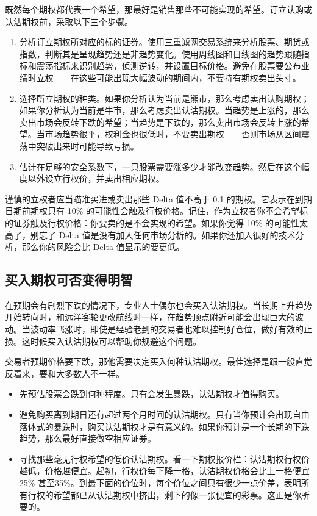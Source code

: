 既然每个期权都代表一个希望，那最好是销售那些不可能实现的希望。订立认购或认沽期权前，采取以下三个步骤。
\begin{enumerate}
    \item 分析订立期权所对应的标的证券。使用三重滤网交易系统来分析股票、期货或指数，判断其是呈现趋势还是非趋势变化。使用周线图和日线图的趋势跟随指标和震荡指标来识别趋势，侦测逆转，并设置目标价格。避免在股票要公布业绩时立权——在这些可能出现大幅波动的期间内，不要持有期权卖出头寸。
    \item 选择所立期权的种类。如果你分析认为当前是熊市，那么考虑卖出认购期权；如果你分析认为当前是牛市，那么考虑卖出认沽期权。当趋势是上涨的，那么卖出市场会反转下跌的希望；当趋势是下跌的，那么卖出市场会反转上涨的希望。当市场趋势很平，权利金也很低时，不要卖出期权——否则市场从区间震荡中突破出来时可能导致亏损。
    \item 估计在足够的安全系数下，一只股票需要涨多少才能改变趋势。然后在这个幅度以外设立行权价，并卖出相应期权。
\end{enumerate}

谨慎的立权者应当瞄准买进或卖出那些 Delta 值不高于 0.1 的期权。它表示在到期日期前期权只有 10\% 的可能性会触及行权价格。记住，作为立权者你不会希望标的证券触及行权价格：你要卖的是不会实现的希望。如果你觉得 10\% 的可能性太高了，别忘了 Delta 值是没有加入任何市场分析的。如果你还加入很好的技术分析，那么你的风险会比 Delta 值显示的要更低。
\subsection*{买入期权可否变得明智}
在预期会有剧烈下跌的情况下，专业人士偶尔也会买入认沽期权。当长期上升趋势开始转向时，和远洋客轮更改航线时一样，在趋势顶点附近可能会出现巨大的波动。当波动率飞涨时，即使是经验老到的交易者也难以控制好仓位，做好有效的止损。这时候买入认沽期权可以帮助你规避这个问题。

交易者预期价格要下跌，那他需要决定买入何种认沽期权。最佳选择是跟一般直觉反着来，要和大多数人不一样。
\begin{itemize}
    \item 先预估股票会跌到何种程度。只有会发生暴跌，认沽期权才值得购买。
    \item 避免购买离到期日还有超过两个月时间的认沽期权。只有当你预计会出现自由落体式的暴跌时，购买认沽期权才是有意义的。如果你预计是一个长期的下跌趋势，那么最好直接做空相应证券。
    \item 寻找那些毫无行权希望的低价认沽期权。看一下期权报价栏：认沽期权行权价越低，价格越便宜。起初，行权价每下降一格，认沽期权价格会比上一格便宜 25\% 甚至35\%。到最下面的价位时，每个价位之间只有很少一点价差，表明所有行权的希望都已从认沽期权中挤出，剩下的像一张便宜的彩票。这正是你所要的。
\end{itemize}
